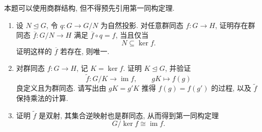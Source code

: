 \documentclass{article}
\begin{document}
\begin{problem}
本题可以使用商群结构, 但不得预先引用第一同构定理.
\begin{enumerate}
  \item[(a)] 设 $N\unlhd G$, 令 $q:G\to G/N$ 为自然投影. 对任意群同态 $f:G\to H$, 证明存在群同态 $\overline f:G/N\to H$ 满足 $\overline f\circ q=f$, 当且仅当
  \[
    N\subseteq\ker f.
  \]
  证明这样的 $\overline f$ 若存在, 则唯一.
  \item[(b)] 对群同态 $f:G\to H$, 记 $K=\ker f$. 证明 $K\unlhd G$, 并验证
  \[
    \widetilde f:G/K\longrightarrow\operatorname{im}f,\qquad gK\longmapsto f(g)
  \]
  良定义且为群同态. 请写出由 $gK=g'K$ 推得 $f(g)=f(g')$ 的过程, 以及 $\widetilde f$ 保持乘法的计算.
  \item[(c)] 证明 $\widetilde f$ 是双射, 其集合逆映射也是群同态, 从而得到第一同构定理
  \[
    G/\ker f\cong\operatorname{im}f.
  \]
\end{enumerate}
\end{problem}
\end{document}
